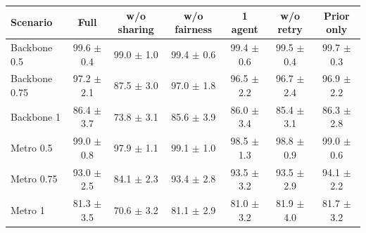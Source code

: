 \begin{tabular}{lcccccc}
\toprule
Scenario & Full & w/o sharing & w/o fairness & 1 agent & w/o retry & Prior only \\
\midrule
Backbone 0.5 & 99.6 $\pm$ 0.4 & 99.0 $\pm$ 1.0 & 99.4 $\pm$ 0.6 & 99.4 $\pm$ 0.6 & 99.5 $\pm$ 0.4 & 99.7 $\pm$ 0.3 \\
Backbone 0.75 & 97.2 $\pm$ 2.1 & 87.5 $\pm$ 3.0 & 97.0 $\pm$ 1.8 & 96.5 $\pm$ 2.2 & 96.7 $\pm$ 2.4 & 96.9 $\pm$ 2.2 \\
Backbone 1 & 86.4 $\pm$ 3.7 & 73.8 $\pm$ 3.1 & 85.6 $\pm$ 3.9 & 86.0 $\pm$ 3.4 & 85.4 $\pm$ 3.1 & 86.3 $\pm$ 2.8 \\
Metro 0.5 & 99.0 $\pm$ 0.8 & 97.9 $\pm$ 1.1 & 99.1 $\pm$ 1.0 & 98.5 $\pm$ 1.3 & 98.8 $\pm$ 0.9 & 99.0 $\pm$ 0.6 \\
Metro 0.75 & 93.0 $\pm$ 2.5 & 84.1 $\pm$ 2.3 & 93.4 $\pm$ 2.8 & 93.5 $\pm$ 3.2 & 93.5 $\pm$ 2.9 & 94.1 $\pm$ 2.2 \\
Metro 1 & 81.3 $\pm$ 3.5 & 70.6 $\pm$ 3.2 & 81.1 $\pm$ 2.9 & 81.0 $\pm$ 3.2 & 81.9 $\pm$ 4.0 & 81.7 $\pm$ 3.2 \\
\bottomrule
\end{tabular}